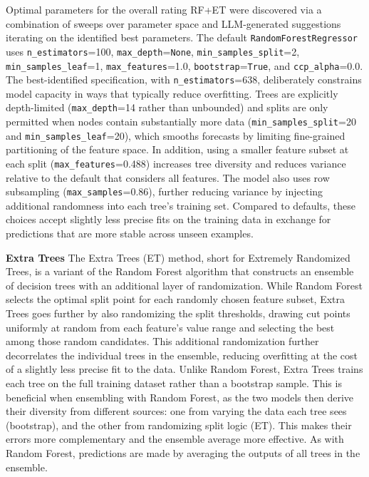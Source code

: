 Optimal parameters for the overall rating RF+ET were discovered via a combination of sweeps over parameter space and LLM-generated suggestions iterating on the identified best parameters. The default \texttt{RandomForestRegressor} uses \texttt{n\_estimators}=100, \texttt{max\_depth}=\texttt{None}, \texttt{min\_samples\_split}=2, \texttt{min\_samples\_leaf}=1, \texttt{max\_features}=1.0, \texttt{bootstrap}=\texttt{True}, and \texttt{ccp\_alpha}=0.0. The best-identified specification, with \texttt{n\_estimators}=638, deliberately constrains model capacity in ways that typically reduce overfitting. Trees are explicitly depth-limited (\texttt{max\_depth}=14 rather than unbounded) and splits are only permitted when nodes contain substantially more data (\texttt{min\_samples\_split}=20 and \texttt{min\_samples\_leaf}=20), which smooths forecasts by limiting fine-grained partitioning of the feature space. In addition, using a smaller feature subset at each split (\texttt{max\_features}=0.488) increases tree diversity and reduces variance relative to the default that considers all features. The model also uses row subsampling (\texttt{max\_samples}=0.86), further reducing variance by injecting additional randomness into each tree's training set. Compared to defaults, these choices accept slightly less precise fits on the training data in exchange for predictions that are more stable across unseen examples.

\textbf{Extra Trees}
The Extra Trees (ET) method, short for Extremely Randomized Trees, is a variant of the Random Forest algorithm that constructs an ensemble of decision trees with an additional layer of randomization. While Random Forest selects the optimal split point for each randomly chosen feature subset, Extra Trees goes further by also randomizing the split thresholds, drawing cut points uniformly at random from each feature's value range and selecting the best among those random candidates. This additional randomization further decorrelates the individual trees in the ensemble, reducing overfitting at the cost of a slightly less precise fit to the data. Unlike Random Forest, Extra Trees trains each tree on the full training dataset rather than a bootstrap sample. This is beneficial when ensembling with Random Forest, as the two models then derive their diversity from different sources: one from varying the data each tree sees (bootstrap), and the other from randomizing split logic (ET). This makes their errors more complementary and the ensemble average more effective. As with Random Forest, predictions are made by averaging the outputs of all trees in the ensemble.

